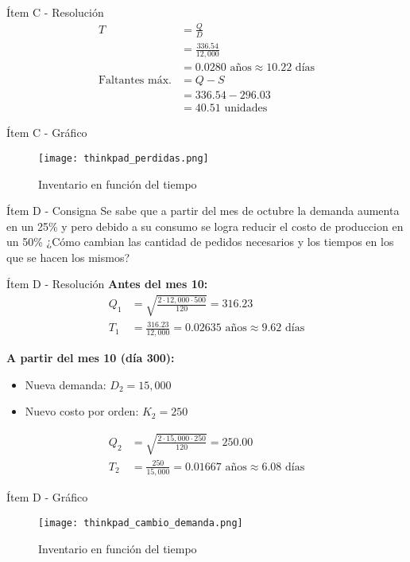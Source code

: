 \documentclass{beamer}
\begin{document}
\begin{frame}{Ítem C - Resolución}
\begin{align*}
T &= \frac{Q}{D} \\
  &= \frac{336.54}{12{,}000} \\
  &= 0.0280 \text{ años} \approx 10.22 \text{ días} \\[1em]
\text{Faltantes máx.} &= Q - S \\
  &= 336.54 - 296.03 \\
  &= 40.51 \text{ unidades}
\end{align*}
\end{frame}

\begin{frame}{Ítem C - Gráfico}
\begin{figure}
    \centering
    \texttt{[image: thinkpad\_perdidas.png]}
    \caption{Inventario en función del tiempo}
\end{figure}
\end{frame}

\begin{frame}{Ítem D - Consigna}
    Se sabe que a partir del mes de octubre la demanda aumenta en un 25\% y pero debido a su consumo se logra reducir el costo de produccion en un 50\% ¿Cómo cambian las cantidad de pedidos necesarios y los tiempos en los que se hacen los mismos?
\end{frame}


\begin{frame}{Ítem D - Resolución}
    \textbf{Antes del mes 10:}
    \begin{align*}
    Q_1 &= \sqrt{\frac{2 \cdot 12{,}000 \cdot 500}{120}} = 316.23 \\
    T_1 &= \frac{316.23}{12{,}000} = 0.02635 \text{ años} \approx 9.62 \text{ días}
    \end{align*}

    \vspace{1em}
    \textbf{A partir del mes 10 (día 300):}
    \begin{itemize}
        \item Nueva demanda: $D_2 = 15{,}000$
        \item Nuevo costo por orden: $K_2 = 250$
    \end{itemize}
    \begin{align*}
    Q_2 &= \sqrt{\frac{2 \cdot 15{,}000 \cdot 250}{120}} = 250.00 \\
    T_2 &= \frac{250}{15{,}000} = 0.01667 \text{ años} \approx 6.08 \text{ días}
    \end{align*}
\end{frame}

\begin{frame}{Ítem D - Gráfico}
\begin{figure}
    \centering
    \texttt{[image: thinkpad\_cambio\_demanda.png]}
    \caption{Inventario en función del tiempo}
\end{figure}
\end{frame}
\end{document}
